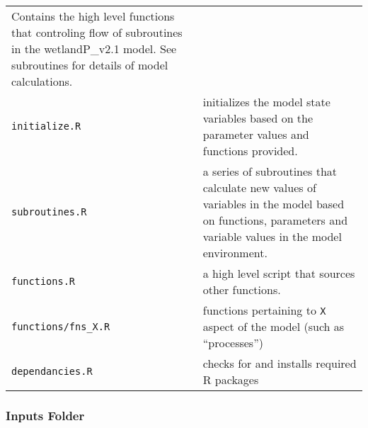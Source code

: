 \documentclass[
]{article}
\begin{document}
\begin{longtable}[]{@{}ll@{}}
\begin{minipage}[t]{0.47\columnwidth}
Contains the high level functions that controling flow of subroutines in
the wetlandP\_v2.1 model. See subroutines for details of model
calculations.\strut
\end{minipage}\tabularnewline
\begin{minipage}[t]{0.47\columnwidth}\raggedright
\texttt{initialize.R}\strut
\end{minipage} & \begin{minipage}[t]{0.47\columnwidth}\raggedright
initializes the model state variables based on the parameter values and
functions provided.\strut
\end{minipage}\tabularnewline
\begin{minipage}[t]{0.47\columnwidth}\raggedright
\texttt{subroutines.R}\strut
\end{minipage} & \begin{minipage}[t]{0.47\columnwidth}\raggedright
a series of subroutines that calculate new values of variables in the
model based on functions, parameters and variable values in the model
environment.\strut
\end{minipage}\tabularnewline
\begin{minipage}[t]{0.47\columnwidth}\raggedright
\texttt{functions.R}\strut
\end{minipage} & \begin{minipage}[t]{0.47\columnwidth}\raggedright
a high level script that sources other functions.\strut
\end{minipage}\tabularnewline
\begin{minipage}[t]{0.47\columnwidth}\raggedright
\texttt{functions/fns\_X.R}\strut
\end{minipage} & \begin{minipage}[t]{0.47\columnwidth}\raggedright
functions pertaining to \texttt{X} aspect of the model (such as
``processes'')\strut
\end{minipage}\tabularnewline
\begin{minipage}[t]{0.47\columnwidth}\raggedright
\texttt{dependancies.R}\strut
\end{minipage} & \begin{minipage}[t]{0.47\columnwidth}\raggedright
checks for and installs required R packages\strut
\end{minipage}\tabularnewline
\bottomrule
\end{longtable}

\hypertarget{inputs-folder}{%
\subsubsection{Inputs Folder}\label{inputs-folder}}
\end{document}
